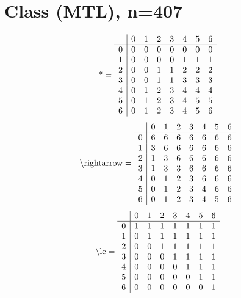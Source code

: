 \documentclass[11pt]{article}
\begin{document}
\section{Class (MTL), n=407}
\[\text{*} = 
\begin{array}{r | r r r r r r r}
 & 0 & 1 & 2 & 3 & 4 & 5 & 6 \\ \hline
0 & 0 & 0 & 0 & 0 & 0 & 0 & 0 \\
1 & 0 & 0 & 0 & 0 & 1 & 1 & 1 \\
2 & 0 & 0 & 1 & 1 & 2 & 2 & 2 \\
3 & 0 & 0 & 1 & 1 & 3 & 3 & 3 \\
4 & 0 & 1 & 2 & 3 & 4 & 4 & 4 \\
5 & 0 & 1 & 2 & 3 & 4 & 5 & 5 \\
6 & 0 & 1 & 2 & 3 & 4 & 5 & 6 \\
\end{array}
\]
\[\text{\textbackslash rightarrow} = 
\begin{array}{r | r r r r r r r}
 & 0 & 1 & 2 & 3 & 4 & 5 & 6 \\ \hline
0 & 6 & 6 & 6 & 6 & 6 & 6 & 6 \\
1 & 3 & 6 & 6 & 6 & 6 & 6 & 6 \\
2 & 1 & 3 & 6 & 6 & 6 & 6 & 6 \\
3 & 1 & 3 & 3 & 6 & 6 & 6 & 6 \\
4 & 0 & 1 & 2 & 3 & 6 & 6 & 6 \\
5 & 0 & 1 & 2 & 3 & 4 & 6 & 6 \\
6 & 0 & 1 & 2 & 3 & 4 & 5 & 6 \\
\end{array}
\]
\[\text{\textbackslash le} = 
\begin{array}{r | r r r r r r r}
 & 0 & 1 & 2 & 3 & 4 & 5 & 6 \\ \hline
0 & 1 & 1 & 1 & 1 & 1 & 1 & 1 \\
1 & 0 & 1 & 1 & 1 & 1 & 1 & 1 \\
2 & 0 & 0 & 1 & 1 & 1 & 1 & 1 \\
3 & 0 & 0 & 0 & 1 & 1 & 1 & 1 \\
4 & 0 & 0 & 0 & 0 & 1 & 1 & 1 \\
5 & 0 & 0 & 0 & 0 & 0 & 1 & 1 \\
6 & 0 & 0 & 0 & 0 & 0 & 0 & 1 \\
\end{array}
\]
\end{document}
